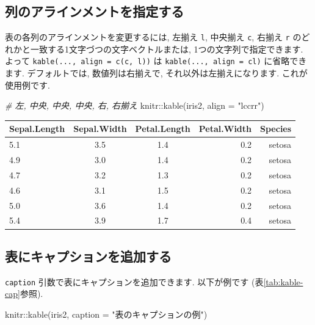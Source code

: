 \documentclass[
  11pt,
  lualatex,ja=standard,jafont=noto]{bxjsreport}
\newenvironment{Shaded}{\begin{snugshade}}{\end{snugshade}}
\newcommand{\AttributeTok}[1]{\textcolor[rgb]{0.77,0.63,0.00}{#1}}
\newcommand{\CommentTok}[1]{\textcolor[rgb]{0.56,0.35,0.01}{\textit{#1}}}
\newcommand{\FunctionTok}[1]{\textcolor[rgb]{0.00,0.00,0.00}{#1}}
\newcommand{\NormalTok}[1]{#1}
\newcommand{\SpecialCharTok}[1]{\textcolor[rgb]{0.00,0.00,0.00}{#1}}
\newcommand{\StringTok}[1]{\textcolor[rgb]{0.31,0.60,0.02}{#1}}
\begin{document}
\hypertarget{specify-column-alignment}{%
\subsection{列のアラインメントを指定する}\label{specify-column-alignment}}

表の各列のアラインメントを変更するには, 左揃え \texttt{l}, 中央揃え \texttt{c}, 右揃え \texttt{r} のどれかと一致する1文字づつの文字ベクトルまたは, 1つの文字列で指定できます. よって \texttt{kable(..., align = c(\textquotesingle{}c\textquotesingle{},\ \textquotesingle{}l\textquotesingle{}))} は \texttt{kable(..., align = \textquotesingle{}cl\textquotesingle{})} に省略できます. デフォルトでは, 数値列は右揃えで, それ以外は左揃えになります. これが使用例です.

\begin{Shaded}
\begin{Highlighting}[numbers=left,,]
\CommentTok{\# 左, 中央, 中央, 中央, 右, 右揃え}
\NormalTok{knitr}\SpecialCharTok{::}\FunctionTok{kable}\NormalTok{(iris2, }\AttributeTok{align =} \StringTok{"lccrr"}\NormalTok{)}
\end{Highlighting}
\end{Shaded}

\begin{tabular}{l|c|c|r|r}
\hline
Sepal.Length & Sepal.Width & Petal.Length & Petal.Width & Species\\
\hline
5.1 & 3.5 & 1.4 & 0.2 & setosa\\
\hline
4.9 & 3.0 & 1.4 & 0.2 & setosa\\
\hline
4.7 & 3.2 & 1.3 & 0.2 & setosa\\
\hline
4.6 & 3.1 & 1.5 & 0.2 & setosa\\
\hline
5.0 & 3.6 & 1.4 & 0.2 & setosa\\
\hline
5.4 & 3.9 & 1.7 & 0.4 & setosa\\
\hline
\end{tabular}

\hypertarget{kable-caption}{%
\subsection{表にキャプションを追加する}\label{kable-caption}}

\texttt{caption} 引数で表にキャプションを追加できます. 以下が例です (表\ref{tab:kable-cap}参照).

\begin{Shaded}
\begin{Highlighting}[numbers=left,,]
\NormalTok{knitr}\SpecialCharTok{::}\FunctionTok{kable}\NormalTok{(iris2, }\AttributeTok{caption =} \StringTok{"表のキャプションの例"}\NormalTok{)}
\end{Highlighting}
\end{Shaded}
\end{document}
